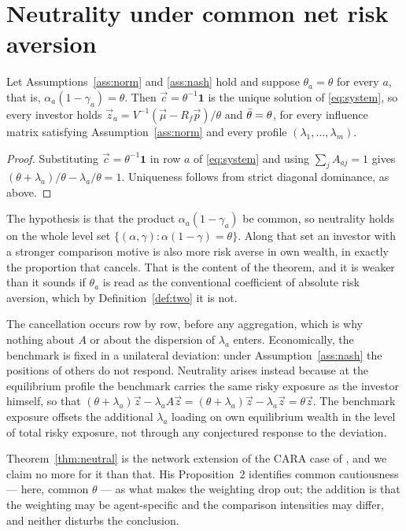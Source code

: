 \section{Neutrality under common net risk aversion}
\label{sec:neutral}

\begin{theorem}
\label{thm:neutral}
Let Assumptions~\ref{ass:norm} and \ref{ass:nash} hold and suppose
$\theta_a=\theta$ for every $a$, that is, $\alpha_a(1-\gamma_a)=\theta$. Then $\vec c=\theta^{-1}\mathbf 1$ is the
unique solution of \eqref{eq:system}, so every investor holds
$\vec z_a=V^{-1}(\vec\mu-R_f\vec p)/\theta$ and $\bar\theta=\theta$, for every influence
matrix satisfying Assumption~\ref{ass:norm} and every profile
$(\lambda_1,\dots,\lambda_m)$.
\end{theorem}

\begin{proof}
Substituting $\vec c=\theta^{-1}\mathbf 1$ in row $a$ of \eqref{eq:system} and
using $\sum_jA_{aj}=1$ gives
$(\theta+\lambda_a)/\theta-\lambda_a/\theta=1$. Uniqueness follows from strict
diagonal dominance, as above.
\end{proof}

The hypothesis is that the product $\alpha_a(1-\gamma_a)$ be common, so
neutrality holds on the whole level set
$\{(\alpha,\gamma):\alpha(1-\gamma)=\theta\}$. Along that set an investor with a
stronger comparison motive is also more risk averse in own wealth, in exactly
the proportion that cancels. That is the content of the theorem, and it is
weaker than it sounds if $\theta_a$ is read as the conventional coefficient of
absolute risk aversion, which by Definition~\ref{def:two} it is not.

The cancellation occurs row by row, before any aggregation, which is why
nothing about $A$ or about the dispersion of $\lambda_a$ enters. Economically, the
benchmark is fixed in a unilateral deviation: under Assumption~\ref{ass:nash}
the positions of others do not respond. Neutrality arises instead because at
the equilibrium profile the benchmark carries the same risky exposure as the
investor himself, so that
$(\theta+\lambda_a)\vec z-\lambda_aA\vec z=(\theta+\lambda_a)\vec z-\lambda_a\vec z=\theta\vec z$.
The benchmark exposure offsets the additional $\lambda_a$ loading on own
equilibrium wealth in the level of total risky exposure, not through any
conjectured response to the deviation.

Theorem~\ref{thm:neutral} is the network extension of the CARA case of
\cite{gomez}, and we claim no more for it than that. His Proposition~2
identifies common cautiousness --- here, common $\theta$ --- as what makes the
weighting drop out; the addition is that the weighting may be agent-specific
and the comparison intensities may differ, and neither disturbs the conclusion.

